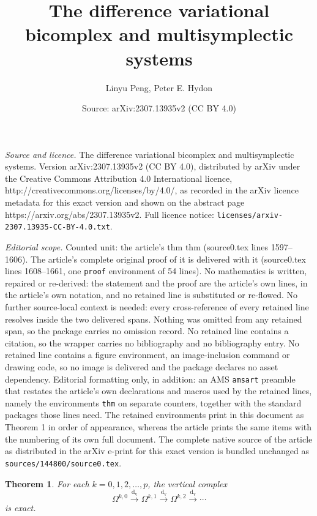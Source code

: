 \documentclass[10pt,a4paper]{amsart}
\title{The difference variational bicomplex and multisymplectic systems}
\author{Linyu Peng, Peter E. Hydon}
\date{Source: arXiv:2307.13935v2 (CC BY 4.0)}
\newtheorem{thm}{Theorem}
\newcommand{\dv}{\upd_{\upv}\!}
\newcommand{\upd}{\operatorname{d}}
\newcommand{\upv}{\operatorname{v}}
\begin{document}
\maketitle

\noindent\emph{Source and licence.} The difference variational bicomplex and multisymplectic systems. Version arXiv:2307.13935v2 (CC BY 4.0), distributed by arXiv under the Creative Commons Attribution 4.0 International licence, http://creativecommons.org/licenses/by/4.0/, as recorded in the arXiv licence metadata for this exact version and shown on the abstract page https://arxiv.org/abs/2307.13935v2. Full licence notice: \texttt{licenses/arxiv-2307.13935-CC-BY-4.0.txt}.\par\smallskip

\noindent\textit{Editorial scope.} Counted unit: the article's thm thm (source0.tex lines 1597--1606). The article's complete original proof of it is delivered with it (source0.tex lines 1608--1661, one \texttt{proof} environment of 54 lines). No mathematics is written, repaired or re-derived: the statement and the proof are the article's own lines, in the article's own notation, and no retained line is substituted or re-flowed.  No further source-local context is needed: every cross-reference of every retained line resolves inside the two delivered spans.  Nothing was omitted from any retained span, so the package carries no omission record.  No retained line contains a citation, so the wrapper carries no bibliography and no bibliography entry.  No retained line contains a figure environment, an image-inclusion command or drawing code, so no image is delivered and the package declares no asset dependency.  Editorial formatting only, in addition: an AMS \texttt{amsart} preamble that restates the article's own declarations and macros used by the retained lines, namely the environments \texttt{thm} on separate counters, together with the standard packages those lines need.  The retained environments print in this document as Theorem 1 in order of appearance, whereas the article prints the same items with the numbering of its own full document.  The complete native source of the article as distributed in the arXiv e-print for this exact version is bundled unchanged as \texttt{sources/144800/source0.tex}.
\begin{thm}
For each $k=0,1,2,\ldots,p$, the vertical complex
\begin{equation*}
\Omega^{k,0}\stackrel{\dv }{\longrightarrow}
\Omega^{k,1}\stackrel{\dv }{\longrightarrow}
\Omega^{k,2}\stackrel{\dv }{\longrightarrow}
\cdots
\end{equation*}
is exact.
\end{thm}
\end{document}
